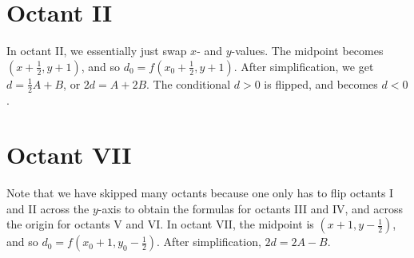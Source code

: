 \documentclass[12pt,letterpaper]{article}
\begin{document}
\section{Octant II}
In octant II, we essentially just swap $x$- and $y$-values.
The midpoint becomes $\left(x + \frac{1}{2}, y + 1\right)$, and so $d_0 = f\left(x_0 + \frac{1}{2}, y + 1\right)$.
After simplification, we get $d = \frac{1}{2} A + B$, or $2d = A + 2B$.
The conditional $d > 0$ is flipped, and becomes $d < 0$.

\section{Octant VII}
Note that we have skipped many octants because one only has to flip octants I and II across the $y$-axis to obtain the formulas for octants III and IV, and across the origin for octants V and VI\@.
In octant VII, the midpoint is $\left(x + 1, y - \frac{1}{2}\right)$, and so $d_0 = f\left(x_0 + 1, y_0 - \frac{1}{2}\right)$.
After simplification, $2d = 2A - B$.
\end{document}

